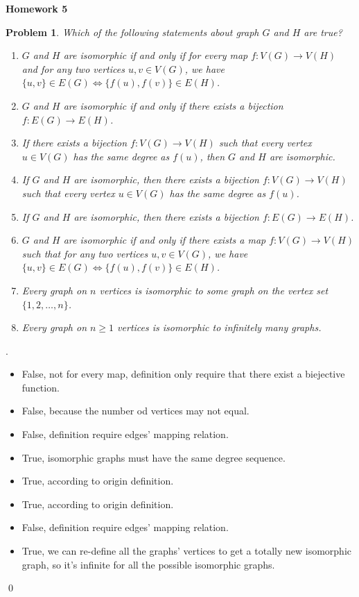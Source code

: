 \documentclass[12pt]{article}
\date{Feb 14, 2012}
\newtheorem{hw}{Problem}
\newenvironment{sol}
  {\par\vspace{3mm}\noindent{\it Solution}.}
  {\qed}
\begin{document}
\begin{center}
{\LARGE\bf Homework 5}\\
\vspace{2mm}
\end{center}

\begin{hw}
  Which of the following statements about graph $G$ and $H$ are true?
  \begin{enumerate}
    \item $G$ and $H$ are isomorphic if and only if for every map $f:V(G)\rightarrow V(H)$ and for any two vertices $u,v\in V(G)$, we have $\{u,v\}\in E(G)\Leftrightarrow \{f(u),f(v)\}\in E(H)$.
    \item $G$ and $H$ are isomorphic if and only if there exists a bijection $f: E(G)\rightarrow E(H)$.
    \item If there exists a bijection $f:V(G)\rightarrow V(H)$ such that every vertex $u\in V(G)$ has the same degree as $f(u)$, then $G$ and $H$ are isomorphic.
    \item If $G$ and $H$ are isomorphic, then there exists a bijection $f:V(G)\rightarrow V(H)$ such that every vertex $u\in V(G) $ has the same degree as $f(u)$.
    \item If $G$ and $H$ are isomorphic, then there exists a bijection $f: E(G)\rightarrow E(H)$.
    \item $G$ and $H$ are isomorphic if and only if there exists a map $f:V(G)\rightarrow V(H)$ such that for any two vertices $u,v\in V(G)$, we have $\{u,v\}\in E(G)\Leftrightarrow \{f(u),f(v)\}\in E(H)$.
    \item Every graph on $n$ vertices is isomorphic to some graph on the vertex set $\{1,2,\ldots, n\}$.
    \item Every graph on $n\geq 1$ vertices is isomorphic to infinitely many graphs.
  \end{enumerate}
\end{hw}

\begin{sol}
\renewcommand{\qedsymbol}{}
    \begin{itemize}
    	\item [(1)] False, not for every map, definition only require that there exist a biejective function.
    	\item [(2)] False, because the number od vertices may not equal.
    	\item [(3)] False, definition require edges' mapping relation.
    	\item [(4)] True, isomorphic graphs must have the same degree sequence.
    	\item [(5)] True, according to origin definition.
    	\item [(6)] True, according to origin definition.
    	\item [(7)] False, definition require edges' mapping relation.
    	\item [(8)] True, we can re-define all the graphs' vertices to get a totally new isomorphic graph, so it's infinite for all the possible isomorphic graphs. 
    \end{itemize}
\end{sol}
\end{document}
